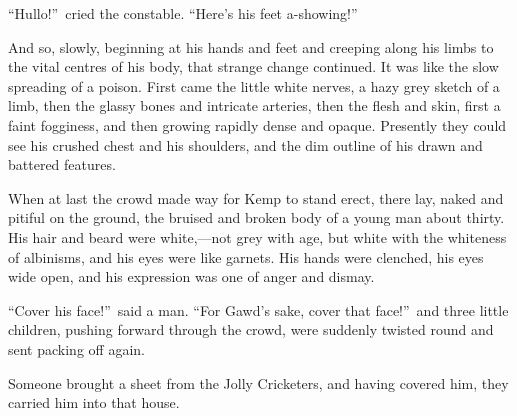 “Hullo!”\ cried the constable. “Here’s his feet a-showing!”

And so, slowly, beginning at his hands and feet and creeping along his limbs to the vital centres of his body, that strange change continued. It was like the slow spreading of a poison. First came the little white nerves, a hazy grey sketch of a limb, then the glassy bones and intricate arteries, then the flesh and skin, first a faint fogginess, and then growing rapidly dense and opaque. Presently they could see his crushed chest and his shoulders, and the dim outline of his drawn and battered features.

When at last the crowd made way for Kemp to stand erect, there lay, naked and pitiful on the ground, the bruised and broken body of a young man about thirty. His hair and beard were white,—not grey with age, but white with the whiteness of albinisms, and his eyes were like garnets. His hands were clenched, his eyes wide open, and his expression was one of anger and dismay.

“Cover his face!”\ said a man. “For Gawd’s sake, cover that face!”\ and three little children, pushing forward through the crowd, were suddenly twisted round and sent packing off again.

Someone brought a sheet from the Jolly Cricketers, and having covered him, they carried him into that house.